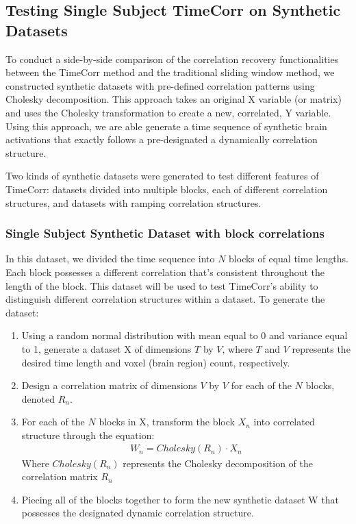 \documentclass[11pt]{article}
\begin{document}
\subsection{Testing Single Subject TimeCorr on Synthetic Datasets}
To conduct a side-by-side comparison of the correlation recovery functionalities between the TimeCorr method and the traditional sliding window method, we constructed synthetic datasets with pre-defined correlation patterns using Cholesky decomposition. This approach takes an original X variable (or matrix) and uses the Cholesky transformation to create a new, correlated, Y variable. Using this approach, we are able generate a time sequence of synthetic brain activations that exactly follows a pre-designated a dynamically correlation structure.

Two kinds of synthetic datasets were generated to test different features of TimeCorr: datasets divided into multiple blocks, each of different correlation structures, and datasets with ramping correlation structures.

\subsubsection{Single Subject Synthetic Dataset with block correlations}

In this dataset, we divided the time sequence into $N$ blocks of equal time lengths. Each block possesses a different correlation that's consistent throughout the length of the block. This dataset will be used to test TimeCorr's ability to distinguish different correlation structures within a dataset. To generate the dataset:
\begin{enumerate}
\item Using a random normal distribution with mean equal to 0 and variance equal to 1, generate a dataset X of dimensions $T$ by $V$, where $T$ and $V$ represents the desired time length and voxel (brain region) count, respectively.
\item Design a correlation matrix of dimensions $V$ by $V$ for each of the $N$ blocks, denoted $R_n$.
\item For each of the $N$ blocks in X, transform the block $X_n$ into correlated structure through the equation:
\begin{align*}
W_n = Cholesky(R_n) \cdot X_n
\end{align*}
Where $Cholesky(R_n)$ represents the Cholesky decomposition of the correlation matrix $R_n$
\item Piecing all of the blocks together to form the new synthetic dataset W that possesses the designated dynamic correlation structure.
\end{enumerate}
\end{document}
